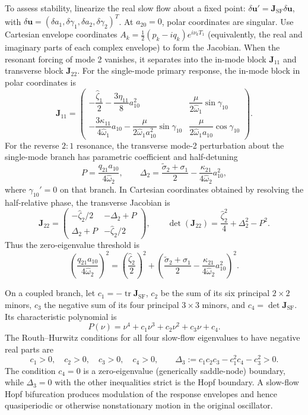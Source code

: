 \documentclass[11pt]{article}
\begin{document}
To assess stability, linearize the real slow flow about a fixed point: $\delta\mathbf{u}'=\mathbf{J}_{\mathrm{SF}}\delta\mathbf{u}$, with $\delta\mathbf{u}=(\delta a_1,\delta\gamma_1,\delta a_2,\delta\gamma_2)^T$. At $a_{20}=0$, polar coordinates are singular. Use Cartesian envelope coordinates $A_k=\tfrac12(p_k-iq_k)e^{i\nu_kT_1}$ (equivalently, the real and imaginary parts of each complex envelope) to form the Jacobian. When the resonant forcing of mode 2 vanishes, it separates into the in-mode block $\mathbf{J}_{11}$ and transverse block $\mathbf{J}_{22}$. For the single-mode primary response, the in-mode block in polar coordinates is
\[
\mathbf{J}_{11}=\begin{pmatrix}
-\dfrac{\hat{\zeta}_1}{2}-\dfrac{3\eta_{11}}{8}a_{10}^2 & \dfrac{\mu}{2\hat{\omega}_1}\sin\gamma_{10}\\[4pt]
-\dfrac{3\kappa_{11}}{4\hat{\omega}_1}a_{10}-\dfrac{\mu}{2\hat{\omega}_1a_{10}^2}\sin\gamma_{10} & \dfrac{\mu}{2\hat{\omega}_1a_{10}}\cos\gamma_{10}
\end{pmatrix}.
\]
For the reverse $2{:}1$ resonance, the transverse mode-2 perturbation about the single-mode branch has parametric coefficient and half-detuning
\[
P=\frac{q_{21}a_{10}}{4\hat{\omega}_2},\qquad
\Delta_2=\frac{\tilde{\sigma}_2+\sigma_1}{2}-\frac{\kappa_{21}}{4\hat{\omega}_2}a_{10}^2,
\]
where $\gamma_{10}'=0$ on that branch. In Cartesian coordinates obtained by resolving the half-relative phase, the transverse Jacobian is
\[
\mathbf{J}_{22}=\begin{pmatrix}
-\hat{\zeta}_2/2&-\Delta_2+P\\
\Delta_2+P&-\hat{\zeta}_2/2
\end{pmatrix},\qquad
\det(\mathbf{J}_{22})=\frac{\hat{\zeta}_2^2}{4}+\Delta_2^2-P^2.
\]
Thus the zero-eigenvalue threshold is
\[
\left(\frac{q_{21}a_{10}}{4\hat{\omega}_2}\right)^2
=\left(\frac{\hat{\zeta}_2}{2}\right)^2
+\left(\frac{\tilde{\sigma}_2+\sigma_1}{2}-\frac{\kappa_{21}}{4\hat{\omega}_2}a_{10}^2\right)^2.
\]

On a coupled branch, let $c_1=-\operatorname{tr}\mathbf{J}_{\mathrm{SF}}$, $c_2$ be the sum of its six principal $2\times2$ minors, $c_3$ the negative sum of its four principal $3\times3$ minors, and $c_4=\det\mathbf{J}_{\mathrm{SF}}$. Its characteristic polynomial is
\begin{equation}\label{eq:slowflow-characteristic}
P(\nu)=\nu^4+c_1\nu^3+c_2\nu^2+c_3\nu+c_4.
\end{equation}
The Routh--Hurwitz conditions for all four slow-flow eigenvalues to have negative real parts are
\[
c_1>0,\quad c_2>0,\quad c_3>0,\quad c_4>0,\qquad
\Delta_3:=c_1c_2c_3-c_1^2c_4-c_3^2>0.
\]
The condition $c_4=0$ is a zero-eigenvalue (generically saddle-node) boundary, while $\Delta_3=0$ with the other inequalities strict is the Hopf boundary. A slow-flow Hopf bifurcation produces modulation of the response envelopes and hence quasiperiodic or otherwise nonstationary motion in the original oscillator.
\end{document}
